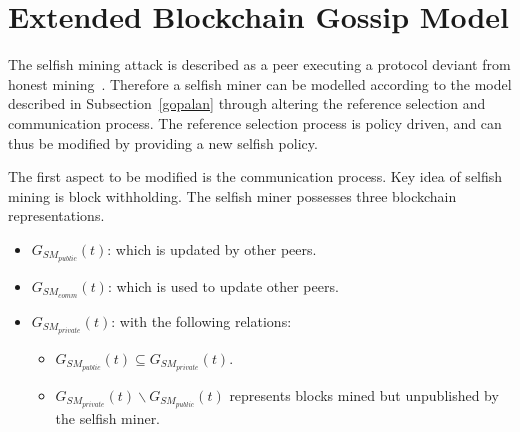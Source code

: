 \section{Extended Blockchain Gossip Model}\label{selfishmodel}
The selfish mining attack is described as a peer executing a protocol deviant from honest mining~\citep{eyal}. Therefore a selfish miner can be modelled according to the model described in Subsection~\ref{gopalan} through altering the reference selection and communication process. The reference selection process is policy driven, and can thus be modified by providing a new selfish policy. 

The first aspect to be modified is the communication process. 
Key idea of selfish mining is block withholding. The selfish miner possesses three blockchain representations. 
\begin{itemize}
\item $G_{SM_{public}}(t)$: which is updated by other peers.
\item $G_{SM_{comm}}(t)$: which is used to update other peers.
\item $G_{SM_{private}}(t)$: with the following relations:
		\begin{itemize}
		\item $G_{SM_{public}}(t)\subseteq G_{SM_{private}}(t)$.
		\item $G_{SM_{private}}(t)\backslash G_{SM_{public}}(t)$ represents blocks mined but unpublished by the selfish miner.
\end{itemize}		
\end{itemize}


